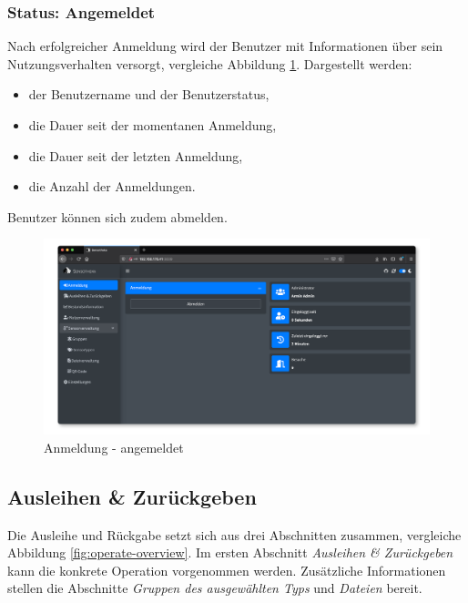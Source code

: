 \documentclass[
]{article}
\providecommand{\tightlist}{%
  \setlength{\itemsep}{0pt}\setlength{\parskip}{0pt}}
\begin{document}
\hypertarget{status-angemeldet}{%
\subsubsection{Status: Angemeldet}\label{status-angemeldet}}

Nach erfolgreicher Anmeldung wird der Benutzer mit Informationen über sein Nutzungsverhalten versorgt, vergleiche Abbildung \ref{fig:login-mask-logged}. Dargestellt werden:

\begin{itemize}
\tightlist
\item
  der Benutzername und der Benutzerstatus,
\item
  die Dauer seit der momentanen Anmeldung,
\item
  die Dauer seit der letzten Anmeldung,
\item
  die Anzahl der Anmeldungen.
\end{itemize}

Benutzer können sich zudem abmelden.

\begin{figure}
\centering
\includegraphics{./img/login_mask_logged.png}
\caption{\label{fig:login-mask-logged}Anmeldung - angemeldet}
\end{figure}

\hypertarget{operate}{%
\subsection{Ausleihen \& Zurückgeben}\label{operate}}

Die Ausleihe und Rückgabe setzt sich aus drei Abschnitten zusammen, vergleiche Abbildung \ref{fig:operate-overview}. Im ersten Abschnitt \emph{Ausleihen \& Zurückgeben} kann die konkrete Operation vorgenommen werden. Zusätzliche Informationen stellen die Abschnitte \emph{Gruppen des ausgewählten Typs} und \emph{Dateien} bereit.
\end{document}
